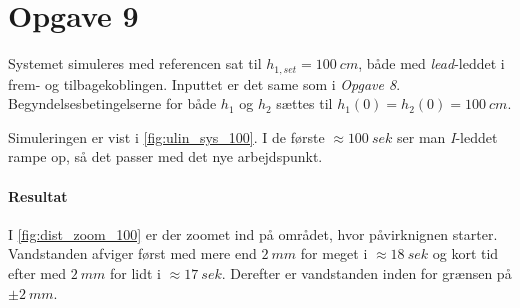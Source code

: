 \section{Opgave 9}
	Systemet simuleres med referencen sat til $h_{1,set} = 100~cm$, både med
	\emph{lead}-leddet i frem- og tilbagekoblingen. Inputtet er det same som i
	\emph{Opgave 8}. Begyndelsesbetingelserne for både $h_1$ og $h_2$ sættes til
	$h_1(0) = h_2(0) = 100~cm$.
	
	Simuleringen er vist i \ref{fig:ulin_sys_100}. I de første $\approx 100~sek$
	ser man \emph{I}-leddet rampe op, så det passer med det nye arbejdspunkt.
	
\paragraph{Resultat}
	I \ref{fig:dist_zoom_100} er der zoomet ind på området, hvor påvirknignen
	starter. Vandstanden afviger først med mere end $2~mm$ for meget i $\approx
	18~sek$ og kort tid efter med $2~mm$ for lidt i $\approx
	17~sek$. Derefter er vandstanden inden for grænsen på $\pm 2~mm$.
	
